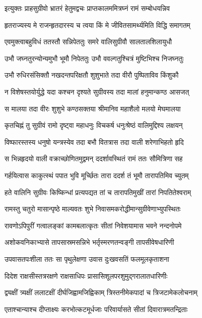 \twolineshloka
{इत्युक्तः प्राहसुग्रीवो भ्रातरं हेतुमद्वचः}
{प्राप्तकालममित्रघ्नं रामं सम्बोधयन्निव}


\twolineshloka
{हृतराज्यस्य मे राजन्हृतदारस्य च त्वया}
{किं मे जीवितसामर्थ्यमिति विद्धि समागतम्}


\twolineshloka
{एवमुक्त्वाबहुविधं ततस्तौ सन्निपेततुः}
{समरे वालिसुग्रीवौ सालतालशिलायुधौ}


\twolineshloka
{उभौ जघ्नतुरन्योन्यमुभौ भूमौ निपेततुः}
{उभौ ववल्गतुश्चित्रं मुष्टिभिश्च निजघ्नतुः}


\twolineshloka
{उभौ रुधिरसंसिक्तौ नखदन्तपरिक्षतौ}
{शुशुभाते तदा वीरौ पुष्पिताविव किंशुकौ}


\twolineshloka
{न विशेषस्तयोर्युद्धे यदा कश्चन दृश्यते}
{सुग्रीवस्य तदा मालां हनुमान्कण्ठ आसजत्}


\twolineshloka
{स मालया तदा वीरः शुशुभे कण्ठसक्तया}
{श्रीमानिव महाशैलो मलयो मेघमालया}


\twolineshloka
{कृतचिह्नं तु सुग्रीवं रामो दृष्ट्वा महाधनुः}
{विचकर्ष धनुःश्रेष्ठं वालिमुद्दिश्य लक्षयन्}


\twolineshloka
{विष्फारस्तस्य धनुषो यन्त्रस्येव तदा बभौ}
{वितत्रास तदा वाली शरेणाभिहतो हृदि}


\twolineshloka
{स भिन्नहृदयो वाली वक्राच्छोणितमुद्वमन्}
{ददर्शावस्थितं रामं ततः सौमित्रिणा सह}


\twolineshloka
{गर्हयित्वास काकुत्स्थं पपात भुवि मूर्च्छितः}
{तारा ददर्श तं भूमौ तारापतिमिव च्युतम्}


\twolineshloka
{हते वालिनि सुग्रीवः किष्किन्धां प्रत्यपद्यत}
{तां च तारापतिमुखीं तारां निपतितेश्वराम्}


\twolineshloka
{रामस्तु चतुरो मासान्पृष्ठे माल्यवतः शुभे}
{निवासमकरोद्धीमान्सुग्रीवेणाभ्युपस्थितः}


\twolineshloka
{रावणोऽपिपुरीं गत्वालङ्कां कामबलात्कृतः}
{सीतां निवेशयामास भवने नन्दनोपमे}


\twolineshloka
{अशोकवनिकाभ्यासे तापसास्रमसन्निभे}
{भर्तृस्मरणतन्वङ्गी तापसीवेषधारिणी}


\twolineshloka
{उपवासतपःशीला ततः सा पृथुलेक्षणा}
{उवास दुःखवसतिं फलमूलकृताशना}


\twolineshloka
{दिदेश राक्षसीस्तत्ररक्षणे राक्षसाधिपः}
{प्रासासिशूलपरशुमुद्गरालातधारिणीः}


\twolineshloka
{द्व्यक्षीं त्र्यक्षीं ललाटक्षीं दीर्घजिह्वामजिह्विकाम्}
{त्रिस्तनीमेकपादां च त्रिजटामेकलोचनाम्}


\twolineshloka
{एताश्चान्याश्च दीप्ताक्ष्यः करभोत्कटमूर्धजाः}
{परिवार्यासते सीतां दिवारात्रमतन्द्रिताः}


